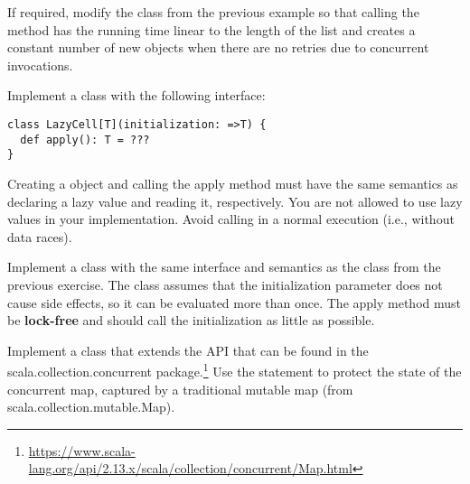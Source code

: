 \documentclass[11pt]{article}
\begin{document}
\begin{myExercise}
If required, modify the  class from the previous example so that calling the  method has the running time linear to the length of the list and creates a constant number of new objects when there are no retries due to concurrent  invocations.
\end{myExercise}
  
\begin{myExercise}
Implement a  class with the following interface:
\begin{lstlisting}
class LazyCell[T](initialization: =>T) {
  def apply(): T = ???
}
\end{lstlisting}
Creating a  object and calling the apply method must have the
same semantics as declaring a lazy value and reading it, respectively.
You are not allowed to use lazy values in your implementation.
Avoid calling  in a normal execution (i.e., without data races).
\end{myExercise}

\begin{myExercise}
Implement a  class with the same interface and semantics as the  class from the previous exercise. The  class assumes that the initialization parameter does not cause side effects, so it can be evaluated more than once.
The apply method must be \textbf{lock-free} and should call the initialization as little as possible.
\end{myExercise}

\begin{myExercise}
Implement a  class that extends the  API that can be found in the scala.collection.concurrent package.\footnote{\url{https://www.scala-lang.org/api/2.13.x/scala/collection/concurrent/Map.html}} Use the  statement to protect the state of the concurrent map, captured by a traditional mutable map (from scala.collection.mutable.Map).
\end{myExercise}

\end{document}
